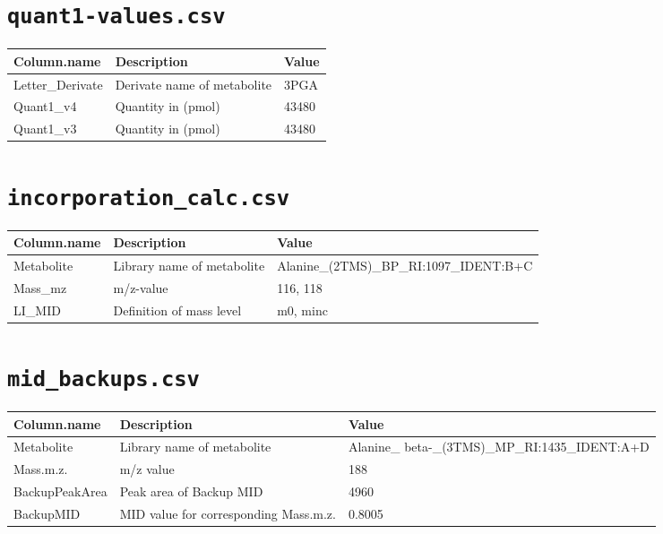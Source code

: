 \documentclass[]{book}
\begin{document}
\hypertarget{quant1-values.csv}{%
\section{\texorpdfstring{\texttt{quant1-values.csv}}{quant1-values.csv}}\label{quant1-values.csv}}

\begin{tabu} to 
\toprule
Column.name & Description & Value\\
\midrule
{}  Letter\_Derivate & Derivate name of metabolite & 3PGA\\
Quant1\_v4 & Quantity in (pmol) & 43480\\
  Quant1\_v3 & Quantity in (pmol) & 43480\\
\bottomrule
\end{tabu}

\hypertarget{incorporation_calc.csv}{%
\section{\texorpdfstring{\texttt{incorporation\_calc.csv}}{incorporation\_calc.csv}}\label{incorporation_calc.csv}}

\begin{tabu} to 
\toprule
Column.name & Description & Value\\
\midrule
{}  Metabolite & Library name of metabolite & Alanine\_(2TMS)\_BP\_RI:1097\_IDENT:B+C\\
Mass\_mz & m/z-value & 116, 118\\
  LI\_MID & Definition of mass level & m0, minc\\
\bottomrule
\end{tabu}

\hypertarget{mid_backups.csv}{%
\section{\texorpdfstring{\texttt{mid\_backups.csv}}{mid\_backups.csv}}\label{mid_backups.csv}}

\begin{tabu} to 
\toprule
Column.name & Description & Value\\
\midrule
{}  Metabolite & Library name of metabolite & Alanine\_ beta-\_(3TMS)\_MP\_RI:1435\_IDENT:A+D\\
Mass.m.z. & m/z value & 188\\
  BackupPeakArea & Peak area of Backup MID & 4960\\
BackupMID & MID value for corresponding Mass.m.z. & 0.8005\\
\bottomrule
\end{tabu}
\end{document}
